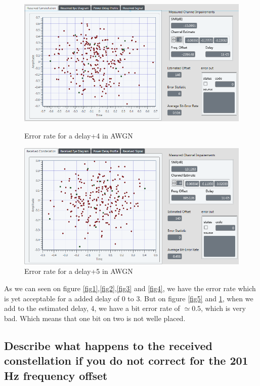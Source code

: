 \documentclass[frenchb, oneside, headings=normal]{scrartcl}
\begin{document}
\begin{figure}[!ht]
    \begin{minipage}[b]{0.48\linewidth}
        \centering \includegraphics[scale=0.45]{img/Sliding_correletaion_OFF_AWGN_5dB_shift_bit_4.PNG}
     \caption{Error rate for a delay+4 in AWGN}
     \label{fig5}
    \end{minipage}\hfill
    \begin{minipage}[b]{0.48\linewidth}
         \centering \includegraphics[scale=0.45]{img/Sliding_correletaion_OFF_AWGN_5dB_shift_bit_5.PNG}
 \caption{Error rate for a delay+5 in AWGN}\label{fig6}
    \end{minipage}
\end{figure}

As we can seen on figure \ref{fig1},\ref{fig2},\ref{fig3} and \ref{fig4}, we have the error rate which is yet acceptable for a added delay of 0 to 3. But on figure \ref{fig5} and \ref{fig6}, when we add to the estimated delay, 4, we have a bit error rate of $\simeq 0.5$, which is very bad. Which means that one bit on two is not welle placed.

\subsection{Describe what happens to the received constellation if you do not correct for the 201 Hz frequency offset}
\end{document}
